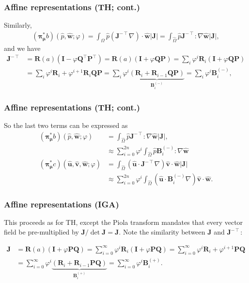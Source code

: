 \documentclass{beamer}
\begin{document}
\begin{frame}
  \frametitle{Affine representations (TH; cont.)}

  Similarly,
  \begin{align*}
    ({\bm\pi}^*_{\bm\mu}b)(
    \hat{p},
    \hat{\bm w};
    \varphi
    ) =
    \int_{\hat{\Omega}} \hat{p} (\bm J^{-\intercal} \nabla) \cdot \hat{\bm w} |\bm J|
    = \int_{\hat{\Omega}} \hat{p} \bm J^{-\intercal} : \nabla \hat{\bm w} |\bm J|,
  \end{align*}
  and we have
  \begin{align*}
    \bm J^{-\intercal}
    &= \bm R(a) (\bm I - \varphi \bm Q^\intercal \bm P^\intercal)
      = \bm R(a) (\bm I + \varphi \bm Q \bm P)
      = \sum_{i}
      \varphi^i \bm R_i
      (\bm I + \varphi \bm Q \bm P) \\
    &= \sum_{i}
      \varphi^i \bm R_i
      + \varphi^{i+1} \bm R_i \bm Q \bm P
      = \sum_{i}
      \varphi^i \underbrace{\left(
      \bm R_i + \bm R_{i-1} \bm Q \bm P
      \right)}_{\bm B^{(-)}_i}
      = \sum_{i} \varphi^i \bm B^{(-)}_i,
  \end{align*}
\end{frame}

\begin{frame}
  \frametitle{Affine representations (TH; cont.)}

  So the last two terms can be expressed as
  \begin{align*}
    ({\bm\pi}^*_{\bm\mu}b)(
    \hat{p},
    \hat{\bm w};
    \varphi
    )
    &= \int_{\hat{\Omega}} \hat{p} \bm J^{-\intercal} : \nabla \hat{\bm w} |\bm J|, \\
    &\approx \sum_{i=0}^{2n} \varphi^i
    \int_{\hat{\Omega}} \hat{p} \bm B^{(-)}_i : \nabla \hat{\bm w} \\
    ({\bm\pi}^*_{\bm\mu}c)(
    \hat{\bm u},
    \hat{\bm v},
    \hat{\bm w};
    \varphi
    )
    &= \int_{\hat{\Omega}} (\hat{\bm u} \cdot \bm J^{-\intercal}\nabla) \hat{\bm v} \cdot \hat{\bm w} |\bm J| \\
    &\approx \sum_{i=0}^{2n} \varphi^i \int_{\hat{\Omega}}
    (\hat{\bm u} \cdot \bm B^{(-)}_i \nabla) \hat{\bm v} \cdot \hat{\bm w}.
  \end{align*}
\end{frame}

\begin{frame}
  \frametitle{Affine representations (IGA)}

  This proceeds as for TH, except the Piola transform mandates that
  every vector field be pre-multiplied by $\bm J/\det \bm J = \bm J$. Note
  the similarity between $\bm J$ and $\bm J^{-\intercal}$:

  \begin{align*}
    \nonumber
    \bm J
    &= \bm R(a) (\bm I + \varphi \bm P \bm Q)
      = \sum_{i=0}^\infty \varphi^i \bm R_i (\bm I + \varphi \bm P \bm Q)
      = \sum_{i=0}^\infty \varphi^i \bm R_i + \varphi^{i+1} \bm P \bm Q \\
    &= \sum_{i=0}^\infty
      \varphi^i \underbrace{\left(
      \bm R_i + \bm R_{i-1} \bm P \bm Q
      \right)}_{\bm B^{(+)}_i} = \sum_{i=0}^\infty \varphi^i \bm B^{(+)}_i.
  \end{align*}
\end{frame}
\end{document}
